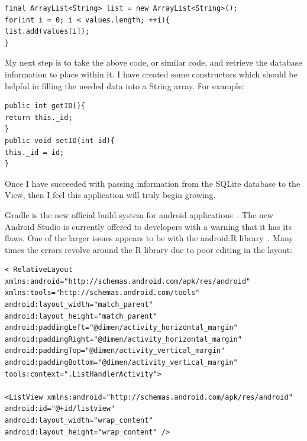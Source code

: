 \documentclass[fontsize=11pt, %
paper=a4, %
twoside, %
captions=tableheading,
index=totoc,
hyperref]{labbook}
\begin{document}
\begin{addmargin}[4cm]{0cm}
\begin{verbatim}
final ArrayList<String> list = new ArrayList<String>();
for(int i = 0; i < values.length; ++i){
list.add(values[i]);
}
\end{verbatim}
\begin{onehalfspace}
My next step is to take the above code, or similar code, and retrieve the database information to place within it. I have created some constructors which should be helpful in filling the needed data into a String array. For example:
\end{onehalfspace}
\begin{verbatim}
public int getID(){
return this._id;
}
public void setID(int id){
this._id = id;
}
\end{verbatim}
\begin{onehalfspace}
Once I have succeeded with passing information from the SQLite database to the View, then I feel this application will truly begin growing.
\end{onehalfspace}
\begin{onehalfspace}
Gradle is the new official build system for android applications~\citep{gradleware}. The new Android Studio is currently offered to developers with a warning that it has its flaws. One of the larger issues appears to be with the android.R library~\citep{R}. Many times the errors revolve around the R library due to poor editing in the layout:
\end{onehalfspace}
\begin{verbatim}
< RelativeLayout xmlns:android="http://schemas.android.com/apk/res/android"
xmlns:tools="http://schemas.android.com/tools"
android:layout_width="match_parent"
android:layout_height="match_parent"
android:paddingLeft="@dimen/activity_horizontal_margin"
android:paddingRight="@dimen/activity_horizontal_margin"
android:paddingTop="@dimen/activity_vertical_margin"
android:paddingBottom="@dimen/activity_vertical_margin"
tools:context=".ListHandlerActivity">

<ListView xmlns:android="http://schemas.android.com/apk/res/android"
android:id="@+id/listview"
android:layout_width="wrap_content"
android:layout_height="wrap_content" />


\end{verbatim}
\end{addmargin}
\end{document}
